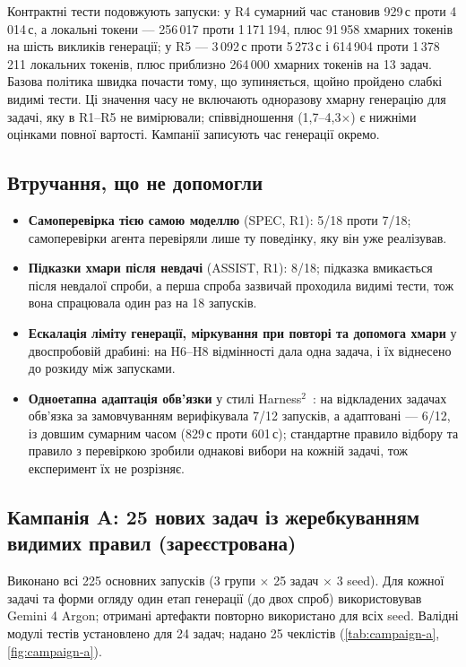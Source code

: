 \documentclass[11pt]{article}
\begin{document}
Контрактні тести подовжують запуски: у R4 сумарний час становив 929\,с проти 4\,014\,с, а локальні токени --- 256\,017 проти 1\,171\,194, плюс 91\,958 хмарних токенів на шість викликів генерації; у R5 --- 3\,092\,с проти 5\,273\,с і 614\,904 проти 1\,378\,211 локальних токенів, плюс приблизно 264\,000 хмарних токенів на 13 задач. Базова політика швидка почасти тому, що зупиняється, щойно пройдено слабкі видимі тести. Ці значення часу не включають одноразову хмарну генерацію для задачі, яку в R1--R5 не вимірювали; співвідношення (1{,}7--4{,}3$\times$) є нижніми оцінками повної вартості. Кампанії записують час генерації окремо.

\subsection{Втручання, що не допомогли}\label{sec:res-negative}
\begin{itemize}
\item \textbf{Самоперевірка тією самою моделлю} (SPEC, R1): 5/18 проти 7/18; самоперевірки агента перевіряли лише ту поведінку, яку він уже реалізував.
\item \textbf{Підказки хмари після невдачі} (ASSIST, R1): 8/18; підказка вмикається після невдалої спроби, а перша спроба зазвичай проходила видимі тести, тож вона спрацювала один раз на 18 запусків.
\item \textbf{Ескалація ліміту генерації, міркування при повторі та допомога хмари} у двоспробовій драбині: на H6--H8 відмінності дала одна задача, і їх віднесено до розкиду між запусками.
\item \textbf{Одноетапна адаптація обв'язки} у стилі Harness$^2$~\citep{harness2}: на відкладених задачах обв'язка за замовчуванням верифікувала 7/12 запусків, а адаптовані --- 6/12, із довшим сумарним часом (829\,с проти 601\,с); стандартне правило відбору та правило з перевіркою зробили однакові вибори на кожній задачі, тож експеримент їх не розрізняє.
\end{itemize}

\subsection{Кампанія A: 25 нових задач із жеребкуванням видимих правил (зареєстрована)}\label{sec:res-a}
Виконано всі 225 основних запусків (3 групи $\times$ 25 задач $\times$ 3 seed). Для кожної задачі та форми огляду один етап генерації (до двох спроб) використовував Gemini 4 Argon; отримані артефакти повторно використано для всіх seed. Валідні модулі тестів установлено для 24 задач; надано 25 чеклістів (\cref{tab:campaign-a}, \cref{fig:campaign-a}).
\end{document}
